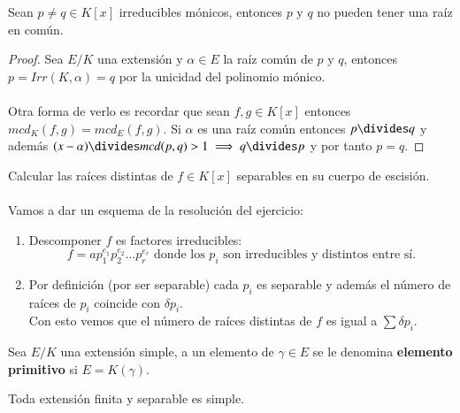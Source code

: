 \begin{pro}
    Sean $p \neq q \in K[x]$ irreducibles mónicos, entonces $p$ y $q$ no pueden tener una raíz en común.
\end{pro}

\begin{proof}
    Sea $E/K$ una extensión y $\alpha \in E$ la raíz común de $p$ y $q$, entonces $p = Irr(K, \alpha) = q$ por la unicidad del polinomio mónico.\\\\
    Otra forma de verlo es recordar que sean $f, g \in K[x]$ entonces $mcd_K(f, g) = mcd_E(f, g)$. Si $\alpha$ es una raíz común entonces $p \divides q$ y además $(x - \alpha) \divides mcd(p, q) > 1 \implies q \divides p$ y por tanto $p = q$.
\end{proof}

\begin{ex}[H3.??]
    Calcular las raíces distintas de $f \in K[x]$ separables en su cuerpo de escisión.\\\\
    Vamos a dar un esquema de la resolución del ejercicio:
    \begin{enumerate}
        \item Descomponer $f$ es factores irreducibles:
        $$
            f = a p_1^{e_1} p_2^{e_2} \ldots p_r^{e_r} \text{ donde los $p_i$ son irreducibles y distintos entre sí.}
        $$
        \item Por definición (por ser separable) cada $p_i$ es separable y además el número de raíces de $p_i$ coincide con $\delta p_i$.\\
        Con esto vemos que el número de raíces distintas de $f$ es igual a $\sum \delta p_i$.
    \end{enumerate}
\end{ex}


\begin{dfn}
    Sea $E/K$ una extensión simple, a un elemento de $\gamma \in E$ se le denomina \textbf{elemento primitivo} si $E = K(\gamma)$.
\end{dfn}

\begin{thm}\label{thm:elemprim}
    Toda extensión finita y separable es simple.
\end{thm}

